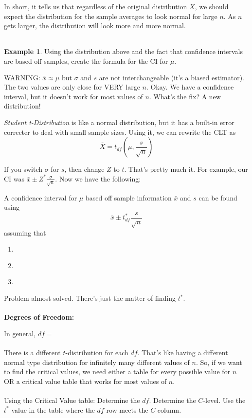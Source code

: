 \documentclass[12pt]{amsart}
\theoremstyle{definition}
\newtheorem{ex}{Example}
\begin{document}
 In short, it tells us that regardless of the original distribution $X$, we should expect the distribution for the sample averages to look normal for large $n$. As $n$ gets larger, the distribution will look more and more normal.\\
 ~\\
 \begin{ex} Using the distribution above and the fact that confidence intervals are based off samples, create the formula for the CI for $\mu$.\end{ex}
 
 \vspace{1in}
 
 WARNING: $\bar{x}\approx \mu$ but $\sigma$ and $s$ are not interchangeable (it's a biased estimator). The two values are only close for VERY large $n$.
 \newpage
 \noindent Okay. We have a confidence interval, but it doesn't work for most values of $n$. What's the fix? A new distribution!
 
 \begin{framed}
 \emph{Student t-Distribution} is like a normal distribution, but it has a built-in error correcter to deal with small sample sizes. Using it, we can rewrite the CLT as $$\bar{X}=t_{df}\left(\mu,\frac{s}{\sqrt{n}}\right)$$
 \end{framed}
 
If you switch $\sigma$ for $s$, then change $Z$ to $t$. That's pretty much it. For example, our CI was $\bar{x}\pm Z^* \frac{\sigma}{\sqrt{n}}$. Now we have the following:
\begin{framed}
 A confidence interval for $\mu$ based off sample information $\bar{x}$ and $s$ can be found using $$\bar{x}\pm t^*_{df} \frac{s}{\sqrt{n}}$$ assuming that
  \begin{enumerate}
  \item \,
  \item \,
  \item \,
 \end{enumerate}
\end{framed}

Problem almost solved. There's just the matter of finding $t^*$.\\
~\\
\textbf{Degrees of Freedom:}
\vspace{2in}

In general, $df=$\\
~\\
\newpage
There is a different $t$-distribution for each $df$. That's like having a different normal type distribution for infinitely many different values of $n$. So, if we want to find the critical values, we need either a table for every possible value for $n$ OR a critical value table that works for most values of $n$.\\
~\\
Using the Critical Value table: Determine the $df$. Determine the $C$-level. Use the $t^*$ value in the table where the $df$ row meets the $C$ column.\\
\end{document}
